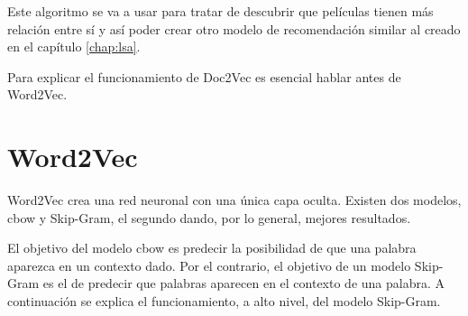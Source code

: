 \documentclass[withindex, glossary]{cam-thesis}
\begin{document}
Este algoritmo se va a usar para tratar de descubrir que películas tienen más relación entre sí y así poder crear otro modelo de recomendación similar al creado en el capítulo \autoref{chap:lsa}.

Para explicar el funcionamiento de Doc2Vec es esencial hablar antes de Word2Vec.

\section{Word2Vec}
Word2Vec crea una red neuronal con una única capa oculta. Existen dos modelos, \acrfull{cbow} y Skip-Gram, el segundo dando, por lo general, mejores resultados.

El objetivo del modelo \acrshort{cbow} es predecir la posibilidad de que una palabra aparezca en un contexto dado. Por el contrario, el objetivo de un modelo Skip-Gram es el de predecir que palabras aparecen en el contexto de una palabra. A continuación se explica el funcionamiento, a alto nivel, del modelo Skip-Gram.
\end{document}
